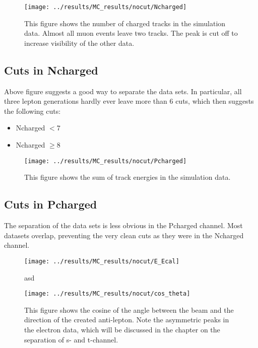 \newpage
\begin{figure}[h]
\centering
\texttt{[image: ../results/MC\_results/nocut/Ncharged]}
\caption[Ncharged in simulation data]{This figure shows the number of charged tracks in the simulation data. Almost all muon events leave two tracks. The peak is cut off to increase visibility of the other data.}
\label{fig:Ncharged}
\end{figure}

\subsection{Cuts in Ncharged}
Above figure suggests a good way to separate the data sets. In particular, all three lepton generations hardly ever leave more than 6 cuts, which then suggests the following cuts:

\begin{itemize}
	\item{ Ncharged $<7$}
	\item{ Ncharged $\ge8$}
\end{itemize}



\newpage
\begin{figure}[h]
\centering
\texttt{[image: ../results/MC\_results/nocut/Pcharged]}
\caption[Pcharged in simulation data]{This figure shows the sum of track energies in the simulation data. }
\label{fig:Pcharged}
\end{figure}

\subsection{Cuts in Pcharged}
The separation of the data sets is less obvious in the Pcharged channel. Most datasets overlap, preventing the very clean cuts as they were in the Ncharged channel.


\begin{figure}[h]
\centering
\texttt{[image: ../results/MC\_results/nocut/E\_Ecal]}
\caption[E_Ecal in simulations]{asd}
\label{fig:E_Ecal}
\end{figure}


\begin{figure}[h]
\centering
\texttt{[image: ../results/MC\_results/nocut/cos\_theta]}
\caption[Cos\_theta in simulation data]{This figure shows the cosine of the angle between the beam and the direction of the created anti-lepton. Note the asymmetric peaks in the electron data, which will be discussed in the chapter on the separation of s- and t-channel.}
\label{fig:cos_theta}
\end{figure}

